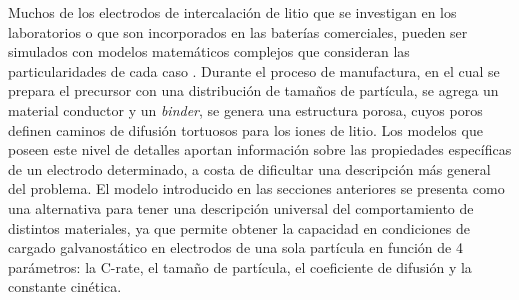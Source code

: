 Muchos de los electrodos de intercalación de litio que se investigan en los 
laboratorios o que son incorporados en las baterías comerciales, pueden ser simulados
con modelos matemáticos complejos que consideran las particularidades de cada
caso \cite{doyle1995}. Durante el proceso de manufactura, en el cual se prepara
el precursor con una distribución de tamaños de partícula, se agrega un material conductor y
un \textit{binder}, se genera una estructura porosa, cuyos poros definen
caminos de difusión tortuosos para los iones de litio. Los modelos que poseen
este nivel de detalles \cite{doyle1995} aportan información sobre las propiedades
específicas de un electrodo determinado, a costa de dificultar una descripción
más general del problema. El modelo introducido en las secciones anteriores 
se presenta como una alternativa para tener una descripción universal del 
comportamiento de distintos materiales, ya que permite obtener la capacidad en 
condiciones de cargado galvanostático en electrodos de una sola partícula en 
función de 4 parámetros: la C-rate, el tamaño de partícula, el coeficiente de 
difusión y la constante cinética.

